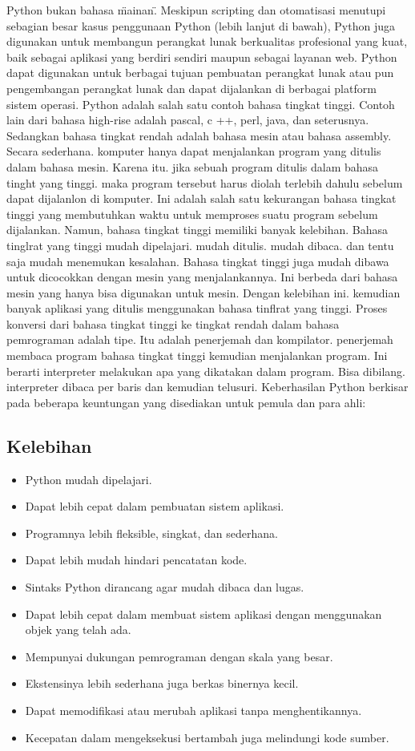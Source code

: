 	Python bukan bahasa \"mainan\". Meskipun scripting dan otomatisasi menutupi sebagian besar kasus penggunaan Python (lebih lanjut di bawah), Python juga digunakan untuk membangun perangkat lunak berkualitas profesional yang kuat, baik sebagai aplikasi yang berdiri sendiri maupun sebagai layanan web.
	Python dapat digunakan untuk berbagai tujuan pembuatan perangkat lunak atau pun pengembangan perangkat lunak dan dapat dijalankan di berbagai platform sistem operasi. Python adalah salah satu contoh bahasa tingkat tinggi. 
	Contoh lain dari bahasa high-rise adalah pascal, c ++, perl, java, dan seterusnya. Sedangkan bahasa tingkat rendah adalah bahasa mesin atau bahasa assembly. 
	Secara sederhana. komputer hanya dapat menjalankan program yang ditulis dalam bahasa mesin. Karena itu. jika sebuah program ditulis dalam bahasa tinght yang tinggi. maka program tersebut harus diolah terlebih dahulu sebelum dapat dijalanlon di komputer. 
	Ini adalah salah satu kekurangan bahasa tingkat tinggi yang membutuhkan waktu untuk memproses suatu program sebelum dijalankan. Namun, bahasa tingkat tinggi memiliki banyak kelebihan. Bahasa tinglrat yang tinggi mudah dipelajari. mudah ditulis. mudah dibaca. dan tentu saja mudah menemukan kesalahan. Bahasa tingkat tinggi juga mudah dibawa untuk dicocokkan dengan mesin yang menjalankannya. 
	Ini berbeda dari bahasa mesin yang hanya bisa digunakan untuk mesin. Dengan kelebihan ini. kemudian banyak aplikasi yang ditulis menggunakan bahasa tinflrat yang tinggi. 
	Proses konversi dari bahasa tingkat tinggi ke tingkat rendah dalam bahasa pemrograman adalah tipe. Itu adalah penerjemah dan kompilator. penerjemah membaca program bahasa tingkat tinggi kemudian menjalankan program. 
	Ini berarti interpreter melakukan apa yang dikatakan dalam program. Bisa dibilang. interpreter dibaca per baris dan kemudian telusuri.
	Keberhasilan Python berkisar pada beberapa keuntungan yang disediakan untuk pemula dan para ahli:
	
	\subsection{Kelebihan}
		\begin{itemize}
			\item Python mudah dipelajari.
			\item Dapat lebih cepat dalam pembuatan sistem aplikasi.
			\item Programnya lebih fleksible, singkat, dan sederhana.
			\item Dapat lebih mudah hindari pencatatan kode.
			\item Sintaks Python dirancang agar mudah dibaca dan lugas.
			\item Dapat lebih cepat dalam membuat sistem aplikasi dengan menggunakan objek yang telah ada.
			\item Mempunyai dukungan pemrograman dengan skala yang besar.
			\item Ekstensinya lebih sederhana juga berkas binernya kecil.
			\item Dapat memodifikasi atau merubah aplikasi tanpa menghentikannya.
			\item Kecepatan dalam mengeksekusi bertambah juga melindungi kode sumber.
		\end{itemize}
		
